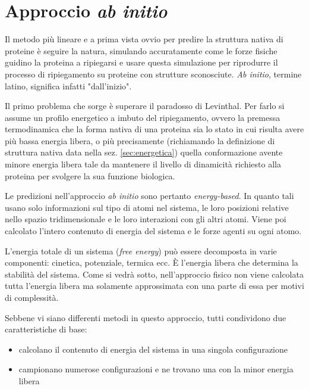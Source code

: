 \section{Approccio \textit{ab initio}}
{
Il metodo più lineare e a prima vista ovvio per predire la struttura nativa di proteine è seguire la natura, simulando accuratamente come le forze fisiche guidino la proteina a ripiegarsi e usare questa simulazione per riprodurre il processo di ripiegamento su proteine con strutture sconosciute. \textit{Ab initio}, termine latino, significa infatti "dall'inizio".

\par Il primo problema che sorge è superare il paradosso di Levinthal. Per farlo si assume un profilo energetico a imbuto del ripiegamento, ovvero la premessa termodinamica che la forma nativa di una proteina sia lo stato in cui risulta avere più bassa energia libera, o più precisamente (richiamando la definizione di struttura nativa data nella sez. \ref{sec:energetica}) quella conformazione avente minore energia libera tale da mantenere il livello di dinamicità richiesto alla proteina per svolgere la sua funzione biologica.

\par Le predizioni nell'approccio \textit{ab initio} sono pertanto \textit{energy-based}. In quanto tali usano solo informazioni sul tipo di atomi nel sistema, le loro posizioni relative nello spazio tridimensionale e le loro interazioni con gli altri atomi. Viene poi calcolato l'intero contenuto di energia del sistema e le forze agenti su ogni atomo. 

\par L'energia totale di un sistema (\textit{free energy}) può essere decomposta in varie componenti: cinetica, potenziale, termica ecc. È l'energia libera che determina la stabilità del sistema. Come si vedrà sotto, nell'approccio fisico non viene calcolata tutta l'energia libera ma solamente approssimata con una parte di essa per motivi di complessità.

\par Sebbene vi siano differenti metodi in questo approccio, tutti condividono due caratteristiche di base:
\begin{itemize}
	\item calcolano il contenuto di energia del sistema in una singola configurazione
	\item campionano numerose configurazioni e ne trovano una con la minor energia libera
\end{itemize}

}
